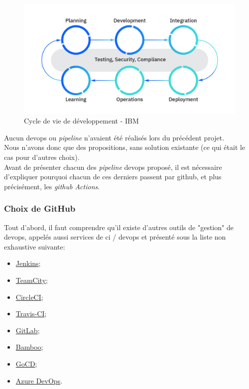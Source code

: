 \documentclass[
    iai, %
    il, %
]{heig-tb}
\begin{document}
\begin{center}
    \begin{figure}[H]
        \includegraphics[width=\textwidth]{./assets/figures/ibm-devops-lifecycle.png}
        \caption[Cycle de vie de développement]{Cycle de vie de développement - IBM} \label{devops-lifecycle}
    \end{figure}
\end{center}

Aucun \Gls{devops} ou \emph{pipeline} n'avaient été réalisés lors du précédent projet.\\
Nous n'avons donc que des propositions, sans solution existante (ce qui était le cas pour d'autres choix).\\

Avant de présenter chacun des \emph{pipeline} \Gls{devops} proposé, il est nécessaire d'expliquer pourquoi chacun de ces derniers passent par \Gls{github}, et plus précisément, les \emph{\Gls{github} Actions}.

\subsubsection{Choix de GitHub}
Tout d'abord, il faut comprendre qu'il existe d'autres outils de "gestion" de \Gls{devops}, appelés
aussi services de \Gls{ci} / \Gls{devops} et présenté sous la liste non exhaustive suivante:
\begin{multicols}{2}
    \begin{itemize}
        \item \href{https://www.jenkins.io/}{Jenkins};
        \item \href{https://www.jetbrains.com/teamcity/}{TeamCity};
        \item \href{https://www.guru99.com/top-20-continuous-integration-tools.html}{CircleCI};
        \item \href{https://www.travis-ci.com/}{Travis-CI};
        \item \href{https://about.gitlab.com/}{GitLab};
        \item \href{https://www.atlassian.com/software/bamboo}{Bamboo};
        \item \href{https://www.gocd.org/}{GoCD};
        \item \href{https://azure.microsoft.com/fr-fr/services/devops/}{Azure DevOps}.
    \end{itemize}
\end{multicols}
\end{document}
